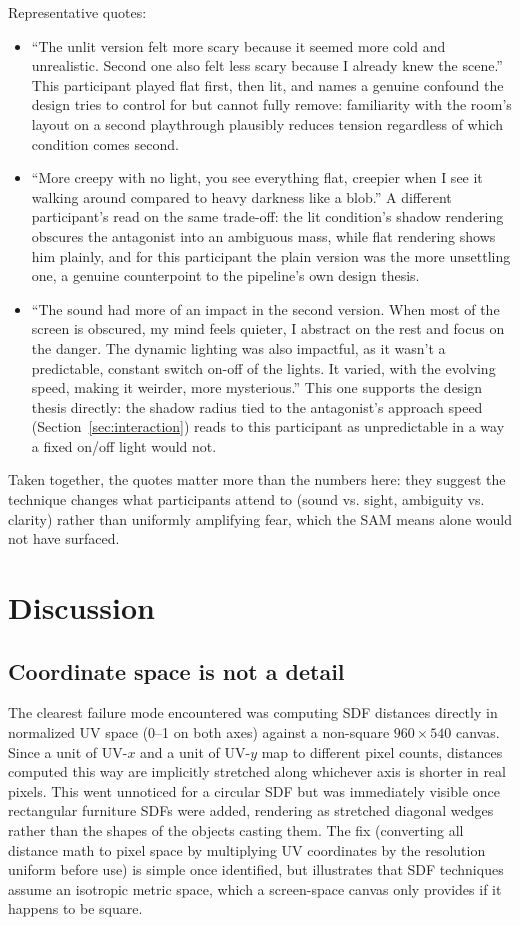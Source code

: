 \documentclass[conference]{IEEEtran}
\begin{document}
Representative quotes:
\begin{itemize}
  \item ``The unlit version felt more scary because it seemed more cold and unrealistic. Second one also felt less scary because I already knew the scene.'' This participant played flat first, then lit, and names a genuine confound the design tries to control for but cannot fully remove: familiarity with the room's layout on a second playthrough plausibly reduces tension regardless of which condition comes second.
  \item ``More creepy with no light, you see everything flat, creepier when I see it walking around compared to heavy darkness like a blob.'' A different participant's read on the same trade-off: the lit condition's shadow rendering obscures the antagonist into an ambiguous mass, while flat rendering shows him plainly, and for this participant the plain version was the more unsettling one, a genuine counterpoint to the pipeline's own design thesis.
  \item ``The sound had more of an impact in the second version. When most of the screen is obscured, my mind feels quieter, I abstract on the rest and focus on the danger. The dynamic lighting was also impactful, as it wasn't a predictable, constant switch on-off of the lights. It varied, with the evolving speed, making it weirder, more mysterious.'' This one supports the design thesis directly: the shadow radius tied to the antagonist's approach speed (Section~\ref{sec:interaction}) reads to this participant as unpredictable in a way a fixed on/off light would not.
\end{itemize}

Taken together, the quotes matter more than the numbers here: they suggest the technique changes what participants attend to (sound vs. sight, ambiguity vs. clarity) rather than uniformly amplifying fear, which the SAM means alone would not have surfaced.

\section{Discussion}
\label{sec:discussion}

\subsection{Coordinate space is not a detail}
The clearest failure mode encountered was computing SDF distances directly in normalized UV space (0--1 on both axes) against a non-square $960\times540$ canvas. Since a unit of UV-$x$ and a unit of UV-$y$ map to different pixel counts, distances computed this way are implicitly stretched along whichever axis is shorter in real pixels. This went unnoticed for a circular SDF but was immediately visible once rectangular furniture SDFs were added, rendering as stretched diagonal wedges rather than the shapes of the objects casting them. The fix (converting all distance math to pixel space by multiplying UV coordinates by the resolution uniform before use) is simple once identified, but illustrates that SDF techniques assume an isotropic metric space, which a screen-space canvas only provides if it happens to be square.
\end{document}
